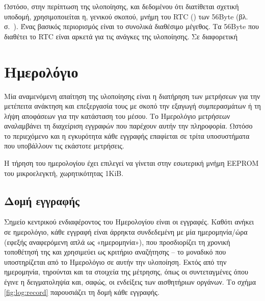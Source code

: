 Ωστόσο, στην περίπτωση της υλοποίησης, και δεδομένου ότι διατίθεται σχετική
υποδομή, χρησιμοποιείται η, γενικού σκοπού, μνήμη του RTC ()
των 56Byte (βλ.  σ.~\pageref{subsec:rtc:user-ram}).
Ένας βασικός περιορισμός είναι το συνολικά διαθέσιμο μέγεθος. Τα 56Byte που
διαθέτει το RTC είναι αρκετά για τις ανάγκες της υλοποίησης. Σε διαφορετική



\section{Ημερολόγιο}
\label{sec:log}

Μία αναμενόμενη απαίτηση της υλοποίησης είναι η διατήρηση των μετρήσεων για την
μετέπειτα ανάκτηση και επεξεργασία τους με σκοπό την εξαγωγή συμπερασμάτων ή τη
λήψη αποφάσεων για την κατάσταση του μέσου. Το Ημερολόγιο μετρήσεων αναλαμβάνει
τη διαχείριση εγγραφών που παρέχουν αυτήν την πληροφορία. Ωστόσο το περιεχόμενο
και η εγκυρότητα κάθε εγγραφής επαφίεται σε τρίτα υποσυστήματα που υποβάλλουν
τις εκάστοτε μετρήσεις.

Η τήρηση του ημερολογίου έχει επιλεγεί να γίνεται στην εσωτερική μνήμη EEPROM
του μικροελεγκτή, χωρητικότητας 1KiB.


%
%

\subsection{Δομή εγγραφής}

Σημείο κεντρικού ενδιαφέροντος του Ημερολογίου είναι οι εγγραφές.
Καθότι ανήκει σε ημερολόγιο, κάθε εγγραφή είναι άρρηκτα συνδεδεμένη με μία
ημερομηνία\slash ώρα (εφεξής αναφερόμενη απλά ως «ημερομηνία»), που προσδιορίζει
τη χρονική τοποθέτησή της και χρησιμεύει ως κριτήριο αναζήτησης -- το μοναδικό
που υποστηρίζεται από το Ημερολόγιο σε αυτήν την υλοποίηση.
Εκτός από την ημερομηνία, τηρούνται και τα στοιχεία της μέτρησης, όπως οι
συντεταγμένες όπου έγινε η δειγματοληψία και, σαφώς, οι ενδείξεις των
αισθητήριων οργάνων. Το σχήμα \ref{fig:log:record} παρουσιάζει τη δομή κάθε
εγγραφής.

